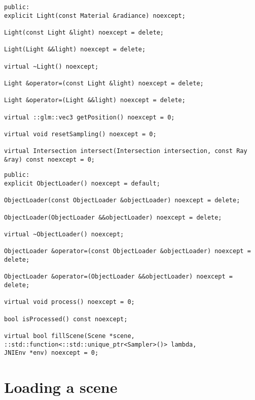 \begin{lstlisting}[caption={Light API}, captionpos=b, label=API_Light]
public:
explicit Light(const Material &radiance) noexcept;

Light(const Light &light) noexcept = delete;

Light(Light &&light) noexcept = delete;

virtual ~Light() noexcept;

Light &operator=(const Light &light) noexcept = delete;

Light &operator=(Light &&light) noexcept = delete;

virtual ::glm::vec3 getPosition() noexcept = 0;

virtual void resetSampling() noexcept = 0;

virtual Intersection intersect(Intersection intersection, const Ray &ray) const noexcept = 0;
\end{lstlisting}

\begin{lstlisting}[caption={ObjectLoader API}, captionpos=b, label=API_ObjectLoader]
public:
explicit ObjectLoader() noexcept = default;

ObjectLoader(const ObjectLoader &objectLoader) noexcept = delete;

ObjectLoader(ObjectLoader &&objectLoader) noexcept = delete;

virtual ~ObjectLoader() noexcept;

ObjectLoader &operator=(const ObjectLoader &objectLoader) noexcept = delete;

ObjectLoader &operator=(ObjectLoader &&objectLoader) noexcept = delete;

virtual void process() noexcept = 0;

bool isProcessed() const noexcept;

virtual bool fillScene(Scene *scene,
::std::function<::std::unique_ptr<Sampler>()> lambda,
JNIEnv *env) noexcept = 0;
\end{lstlisting}

\section{Loading a scene}

\par


